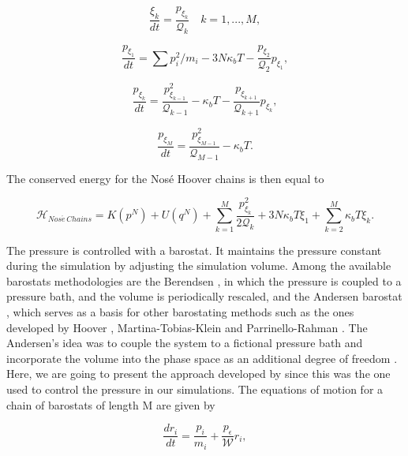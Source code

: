 \begin{equation}
\frac{\xi _{k}}{dt} = \frac{p_{\xi _k}}{\mathcal{Q} _{k}} \quad k = 1,...,M ,
\end{equation}

\begin{equation}
\frac{p_{\xi _1}}{dt} = {\sum p_{i}^{2}/m_{i} - 3N\kappa_{b}T} -  \frac{p_{\xi _{2}}}{\mathcal{Q} _2}p_{\xi _{1}},
\end{equation}

\begin{equation}
\frac{p_{\xi _k}}{dt} = \frac{p_{\xi _{k -1}}^{2}}{\mathcal{Q} _{k-1}} - \kappa_{b}T - \frac{p_{\xi _{k+1}}}{\mathcal{Q} _{k+1}}p_{\xi _{k}},
\end{equation}

\begin{equation}
\frac{p_{\xi _M}}{dt} = \frac{ p_{\xi _{M-1}}^{2}}{\mathcal{Q} _{M-1}} - \kappa_{b}T .
\end{equation}

The conserved energy for the Nos\'{e} Hoover chains is then equal to

\begin{equation}
\mathcal{H}_{Nos\acute{e} \, Chains} =  K(p^{N}) + U(q^{N})  + \sum_{k=1}^{M }\frac{p^{2}_{\xi _{k}}}{2\mathcal{Q} _{k}} + 3N\kappa_{b}T \xi _{1} + \sum_{k=2}^{M} \kappa_{b}T \xi _{k}.
\end{equation}

The pressure is controlled with a barostat. It maintains the pressure constant during the simulation by adjusting the simulation volume. Among the available  barostats methodologies are the Berendsen \cite{doi:10.1063/1.448118}, in which the pressure is coupled to a pressure bath, and the volume is periodically rescaled, and the Andersen barostat \cite{1980JChPh722384A}, which serves as a basis for other barostating methods such as the ones developed by Hoover \cite{PhysRevA.31.1695}, Martina-Tobias-Klein \cite{doi:10.1063/1.467468} and Parrinello-Rahman \cite{doi:10.1063/1.328693}. The Andersen's idea was to couple the system to a fictional pressure bath and incorporate the volume into the phase space as an additional degree of freedom \cite{tuckerman}. Here, we are going to present the approach developed by  since this was the one used to control the pressure in our simulations. The equations of motion for a chain of barostats of length M are given by  

\begin{equation}
\frac{dr_{i}}{dt} = \frac{p_i}{m_i} + \frac{p_{\epsilon}}{\mathcal{W}} r_i,
\end{equation}

